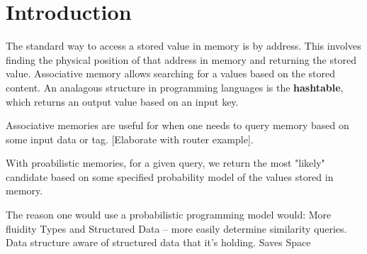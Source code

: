 \documentclass{sig-alternate}
\begin{document}
\section{Introduction}
\label{sec:intro}

The standard way to access a stored value in memory is by address. 
This involves finding the physical position of that address in memory
and returning the stored value. Associative memory allows
searching for a values based on the stored content. An analagous structure
in programming languages is the \textbf{hashtable}, which returns an output value
based on an input key. 

Associative memories are useful for when one needs to query memory based 
on some input data or tag. [Elaborate with router example]. 

With proabilistic memories, for a given query, we return the most "likely" candidate 
based on some specified probability model of the values stored in memory. 

The reason one would use a probabilistic programming model would:
More fluidity
Types and Structured Data -- more easily determine similarity queries. Data structure aware of structured data that it's holding.
Saves Space
%
\end{document}

